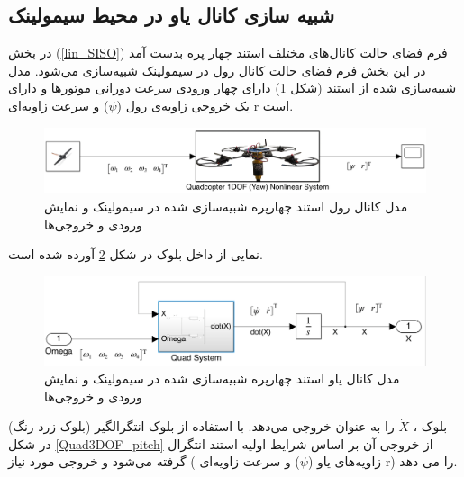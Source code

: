 \subsection{شبیه سازی کانال یاو در محیط سیمولینک}
در بخش
(\ref{lin_SISO})
فرم فضای حالت کانال‌های مختلف استند چهار پره بدست آمد در این بخش فرم فضای حالت کانال رول در سیمولینک شبیه‌سازی می‌شود.
مدل شبیه‌سازی شده از استند (شکل \ref{yaw_simulink}) دارای چهار ورودی سرعت دورانی موتورها  و دارای یک خروجی زاویه‌ی رول ($\psi$) و  سرعت زاویه‌ای r است.
\begin{figure}[H]
	\includegraphics[width=16cm]{../../Figures/QuadSimulation/yaw_Stand_Model.png}
	\centering
	\vspace*{-15mm}
	\caption{مدل کانال رول استند چهارپره شبیه‌سازی شده در سیمولینک و نمایش ورودی و خروجی‌ها}
	\label{yaw_simulink}
\end{figure}

نمایی از داخل بلوک
در شکل \ref{Quad1DOF_yaw} آورده شده است.
\begin{figure}[H]
	\includegraphics[width=16cm]{../../Figures/QuadSimulation/yaw_Integrator.png}
	\centering
	\vspace*{-15mm}
	\caption{مدل کانال یاو استند چهارپره شبیه‌سازی شده در سیمولینک و نمایش ورودی و خروجی‌ها}
	\label{Quad1DOF_yaw}
\end{figure}
بلوک
،
$\dot X$ را به عنوان خروجی می‌دهد. با استفاده از بلوک انتگرالگیر (بلوک زرد رنگ) در شکل
\ref{Quad3DOF_pitch}
از خروجی آن بر اساس شرایط اولیه استند انتگرال گرفته می‌شود و خروجی مورد نیاز ( زاویه‌های یاو ($\psi$) و سرعت زاویه‌ای‌
r)
را می دهد.

